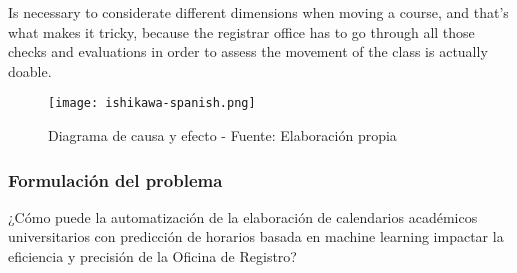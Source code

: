 Is necessary to considerate different dimensions when moving a course, and that's what makes it tricky, because the registrar office has to go through all those checks and evaluations in order to assess the movement of the class is actually doable.

\begin{figure}[H]
    \centering
    \texttt{[image: ishikawa-spanish.png]}
    \caption{Diagrama de causa y efecto - Fuente: Elaboración propia}
    \label{fig:ishikawa}
\end{figure}

\subsubsection{Formulación del problema}
¿Cómo puede la automatización de la elaboración de calendarios académicos universitarios con predicción de horarios basada en machine learning impactar la eficiencia y precisión de la Oficina de Registro?
